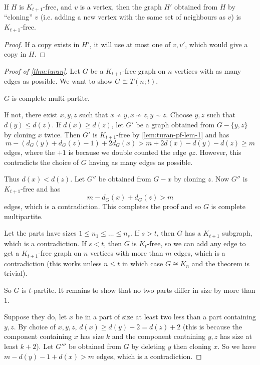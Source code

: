\documentclass[main.tex]{subfiles}
\begin{document}
\begin{lemma}
  \th\label{lem:turan-pf-lem-1}
  If $H$ is $K_{t+1}$-free, and $v$ is a vertex, then the graph $H'$ obtained
  from $H$ by ``cloning'' $v$ (i.e. adding a new vertex with the same set of
  neighbours as $v$) is $K_{t+1}$-free.
\end{lemma}
\begin{proof}
  If a copy exists in $H'$, it will use at most one of $v,v'$,
  which would give a copy in $H$.
\end{proof}

\begin{proof}[Proof of \th\ref{thm:turan}]
  Let $G$ be a $K_{t+1}$-free graph on $n$ vertices with as many edges as possible.
  We want to show $G\cong T(n;t)$.

  \begin{claim}
    $G$ is complete multi-partite.
  \end{claim}
  \begin{subproof}
    If not, there exist $x,y,z$ such that $x\not\sim y, x\not\sim z, y\sim z$.
    Choose $y,z$ such that $d(y)\leq d(z)$.
    If $d(x)\geq d(z)$, let $G'$ be a graph obtained from $G - \{y,z\}$
    by cloning $x$ twice.
    Then $G'$ is $K_{t+1}$-free by \th\ref{lem:turan-pf-lem-1} and has
    \[
      m - (d_G(y) + d_G(z) - 1) + 2d_G(x)
      > m + 2d(x) - d(y) - d(z)\geq m
    \]
    edges, where the $+1$ is because we double counted the edge $yz$.
    However, this contradicts the choice of $G$ having as many edges as possible.

    Thus $d(x) < d(z)$.
    Let $G''$ be obtained from $G - x$ by cloning $z$.
    Now $G''$ is $K_{t+1}$-free and has
    \[
      m - d_G(x) + d_G(z) > m
    \]
    edges, which is a contradiction.
    This completes the proof and so $G$ is complete multipartite.
  \end{subproof}
  Let the parts have sizes $1\leq n_1\leq\ldots\leq n_s$.
  If $s > t$, then $G$ has a $K_{t+1}$ subgraph, which is a contradiction.
  If $s < t$, then $G$ is $K_t$-free, so we can add any edge to get a
  $K_{t+1}$-free graph on $n$ vertices with more than $m$ edges, which is a
  contradiction (this works unless $n\leq t$ in which case $G\cong K_n$
  and the theorem is trivial).

  So $G$ is $t$-partite.
  It remains to show that no two parts differ in size by more than 1.

  Suppose they do, let $x$ be in a part of size at least two less than a part
  containing $y,z$.
  By choice of $x,y,z$, $d(x)\geq d(y) + 2 = d(z) + 2$ (this is because the
  component containing $x$ has size $k$ and the component containing $y,z$ has
  size at least $k+2$).
  Let $G'''$ be obtained from $G$ by deleting $y$ then cloning $x$.
  So we have $m - d(y) - 1 + d(x) > m$ edges, which is a contradiction.
\end{proof}
\end{document}
